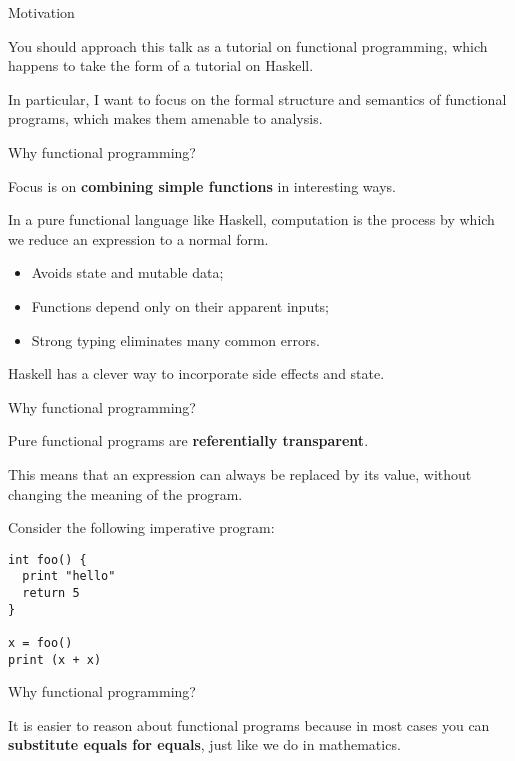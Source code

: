 
%
\begin{frame}{Motivation}

You should approach this talk as a tutorial on functional programming, which
happens to take the form of a tutorial on Haskell.

In particular, I want to focus on the formal structure and semantics of
functional programs, which makes them amenable to analysis.

\end{frame}

%
\begin{frame}{Why functional programming?}

Focus is on \textbf{combining simple functions} in interesting ways.

In a pure functional language like Haskell, computation is the process by which
we reduce an expression to a normal form.

\begin{itemize}
  \item Avoids state and mutable data;
  \item Functions depend only on their apparent inputs;
  \item Strong typing eliminates many common errors.
\end{itemize}

Haskell has a clever way to incorporate side effects and state.

\end{frame}

%
\begin{frame}[fragile]{Why functional programming?}

Pure functional programs are \textbf{referentially transparent}.

This means that an expression can always be replaced by its value, without
changing the meaning of the program.

Consider the following imperative program:

\begin{block}{}
\begin{verbatim}
int foo() {
  print "hello"
  return 5
}

x = foo()
print (x + x)
\end{verbatim}
\end{block}

\end{frame}

%
\begin{frame}[fragile]{Why functional programming?}

It is easier to reason about functional programs because in most cases you can
\textbf{substitute equals for equals}, just like we do in mathematics.

\end{frame}

